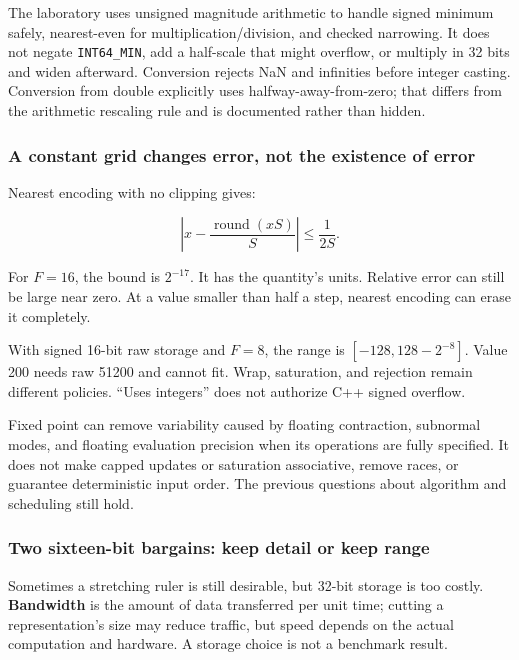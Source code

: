 The laboratory uses unsigned magnitude arithmetic to handle signed minimum safely, nearest-even for multiplication/division, and checked narrowing. It does not negate \texttt{INT64\_MIN}, add a half-scale that might overflow, or multiply in 32 bits and widen afterward. Conversion rejects NaN and infinities before integer casting. Conversion from double explicitly uses halfway-away-from-zero; that differs from the arithmetic rescaling rule and is documented rather than hidden.

\subsubsection{A constant grid changes error, not the existence of error}\label{05-engine-i-ch001-a-constant-grid-changes-error-not-the-existence-of-error}

Nearest encoding with no clipping gives:

\[
\left|x-\frac{\operatorname{round}(xS)}{S}\right|\le\frac{1}{2S}.
\]

For \(F=16\), the bound is \(2^{-17}\). It has the quantity's units. Relative error can still be large near zero. At a value smaller than half a step, nearest encoding can erase it completely.

With signed 16-bit raw storage and \(F=8\), the range is \([-128,128-2^{-8}]\). Value 200 needs raw 51200 and cannot fit. Wrap, saturation, and rejection remain different policies. ``Uses integers'' does not authorize C++ signed overflow.

Fixed point can remove variability caused by floating contraction, subnormal modes, and floating evaluation precision when its operations are fully specified. It does not make capped updates or saturation associative, remove races, or guarantee deterministic input order. The previous questions about algorithm and scheduling still hold.

\subsubsection{Two sixteen-bit bargains: keep detail or keep range}\label{05-engine-i-ch001-two-sixteen-bit-bargains-keep-detail-or-keep-range}

Sometimes a stretching ruler is still desirable, but 32-bit storage is too costly. \textbf{Bandwidth} is the amount of data transferred per unit time; cutting a representation's size may reduce traffic, but speed depends on the actual computation and hardware. A storage choice is not a benchmark result.

